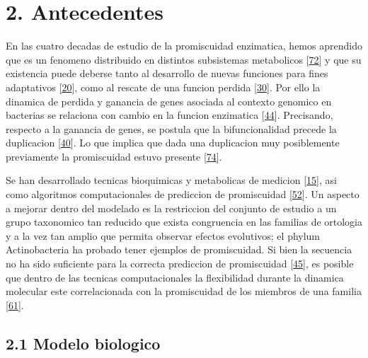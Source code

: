 \documentclass[12pt,twoside]{reedthesis}
\begin{document}
  \section{2. Antecedentes}\label{antecedentes}
  
  En las cuatro decadas de estudio de la promiscuidad enzimatica, hemos
  aprendido que es un fenomeno distribuido en distintos subsistemas
  metabolicos {[}\protect\hyperlink{ref-namux5fnetworkux5f2012}{72}{]} y
  que su existencia puede deberse tanto al desarrollo de nuevas funciones
  para fines adaptativos
  {[}\protect\hyperlink{ref-jensenux5fenzymeux5f1976}{20}{]}, como al
  rescate de una funcion perdida
  {[}\protect\hyperlink{ref-patrickux5fmulticopyux5f2007}{30}{]}. Por ello
  la dinamica de perdida y ganancia de genes asociada al contexto genomico
  en bacterias se relaciona con cambio en la funcion enzimatica
  {[}\protect\hyperlink{ref-zhaoux5fdiscoveryux5f2013}{44}{]}. Precisando,
  respecto a la ganancia de genes, se postula que la bifuncionalidad
  precede la duplicacion
  {[}\protect\hyperlink{ref-hughesux5fevolutionux5f1994}{40}{]}. Lo que
  implica que dada una duplicacion muy posiblemente previamente la
  promiscuidad estuvo presente
  {[}\protect\hyperlink{ref-gerltux5fdivergentux5f2001}{74}{]}.
  
  Se han desarrollado tecnicas bioquimicas y metabolicas de medicion
  {[}\protect\hyperlink{ref-nathux5fquantitativeux5f2008}{15}{]}, asi como
  algoritmos computacionales de prediccion de promiscuidad
  {[}\protect\hyperlink{ref-carbonellux5fmolecularux5f2010}{52}{]}. Un
  aspecto a mejorar dentro del modelado es la restriccion del conjunto de
  estudio a un grupo taxonomico tan reducido que exista congruencia en las
  familias de ortologia y a la vez tan amplio que permita observar efectos
  evolutivos; el phylum Actinobacteria ha probado tener ejemplos de
  promiscuidad. Si bien la secuencia no ha sido suficiente para la
  correcta prediccion de promiscuidad
  {[}\protect\hyperlink{ref-verdel-arandaux5fmolecularux5f2015}{45}{]}, es
  posible que dentro de las tecnicas computacionales la flexibilidad
  durante la dinamica molecular este correlacionada con la promiscuidad de
  los miembros de una familia
  {[}\protect\hyperlink{ref-jamesux5fconformationalux5f2003}{61}{]}.
  
  \subsection{2.1 Modelo biologico}\label{modelo-biologico}
  
\end{document}
